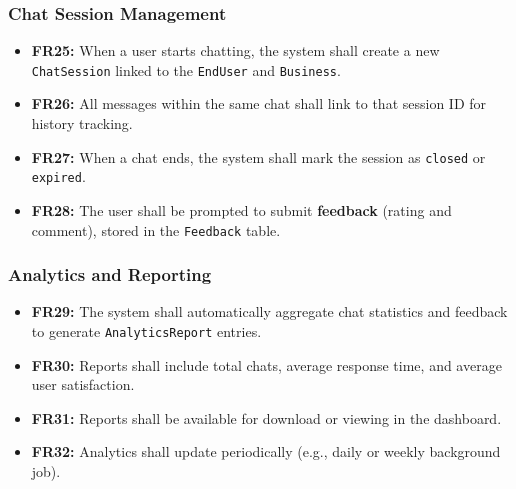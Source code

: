 \documentclass[12pt,a4paper]{article}
\begin{document}
\vspace{1em}
\noindent\hrulefill
\vspace{1em}

\subsubsection{Chat Session Management}
\begin{itemize}
    \item \textbf{FR25:} When a user starts chatting, the system shall create a new \texttt{ChatSession} linked to the \texttt{EndUser} and \texttt{Business}.
    \item \textbf{FR26:} All messages within the same chat shall link to that session ID for history tracking.
    \item \textbf{FR27:} When a chat ends, the system shall mark the session as \texttt{closed} or \texttt{expired}.
    \item \textbf{FR28:} The user shall be prompted to submit \textbf{feedback} (rating and comment), stored in the \texttt{Feedback} table.
\end{itemize}

\vspace{1em}
\noindent\hrulefill
\vspace{1em}

\subsubsection{Analytics and Reporting}
\begin{itemize}
    \item \textbf{FR29:} The system shall automatically aggregate chat statistics and feedback to generate \texttt{AnalyticsReport} entries.
    \item \textbf{FR30:} Reports shall include total chats, average response time, and average user satisfaction.
    \item \textbf{FR31:} Reports shall be available for download or viewing in the dashboard.
    \item \textbf{FR32:} Analytics shall update periodically (e.g., daily or weekly background job).
\end{itemize}

\vspace{1em}
\noindent\hrulefill
\vspace{1em}
\end{document}
